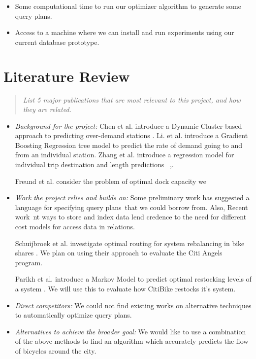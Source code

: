 \documentclass{proc}
\begin{document}
\begin{itemize}
  \item Some computational time to run our optimizer algorithm to generate some query plans.
  \item Access to a machine where we can install and run experiments using our current database prototype.
 \end{itemize}
 
\section{Literature Review}
\begin{quote}
\emph{List 5 major publications that are most relevant to this project, and how they are related.}
\end{quote}

\begin{itemize}
\item \emph{Background for the project:} Chen et al. introduce a Dynamic Cluster-based approach to predicting over-demand stations \cite{chen}.  Li. et al. introduce a Gradient Boosting Regression tree model to predict the rate of demand going to and from an individual station.  Zhang et al. introduce a regression model for individual trip destination and length predictions~ \cite{zhang},. 

Freund et al. consider the problem of optimal dock capacity \cite{freund} we 



\item \emph{Work the project relies and builds on: } Some preliminary work has suggested a language for specifying query plans~that we could borrow from.  Also, Recent work~nt ways to store and index data lend credence to the need for different cost models for access data in relations.

Schuijbroek et al. investigate optimal routing for system rebalancing in bike shares \cite{schu}. We plan on using their approach to evaluate the Citi Angels program.

Parikh et al. introduce a Markov Model to predict optimal restocking levels of a system \cite{parikh}. We will use this to evaluate how CitiBike restocks it's system.

\item \emph{Direct competitors: } We could not find existing works on alternative techniques to automatically optimize query plans.

\item \emph{Alternatives to achieve the broader goal: } We would like to use a combination of the above methods to find an algorithm which accurately predicts the flow of bicycles around the city.
 \end{itemize}
\end{document}
